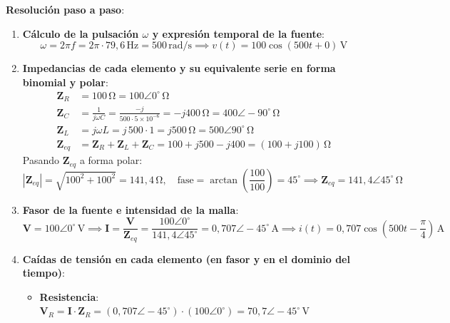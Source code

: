 \begin{ejemplo}
\textbf{Resolución paso a paso}:
\begin{enumerate}
    \item \textbf{Cálculo de la pulsación $\omega$ y expresión temporal de la fuente}:
    \begin{equation*}
        \omega = 2\pi f = 2\pi \cdot 79{,}6\,\si{\hertz} = 500\,\si{\radian/\second} \implies v(t) = 100\cos(500 t + 0)\,\si{\volt}
    \end{equation*}
    \item \textbf{Impedancias de cada elemento y su equivalente serie en forma binomial y polar}:
    \begin{align*}
        \mathbf{Z}_R &= 100\,\si{\ohm} = 100\angle 0^\circ\,\si{\ohm} \\
        \mathbf{Z}_C &= \frac{1}{j\omega C} = \frac{-j}{500 \cdot 5\times 10^{-6}} = -j 400\,\si{\ohm} = 400\angle -90^\circ\,\si{\ohm} \\
        \mathbf{Z}_L &= j\omega L = j\,500\cdot 1 = j 500\,\si{\ohm} = 500\angle 90^\circ\,\si{\ohm} \\
        \mathbf{Z}_{eq} &= \mathbf{Z}_R + \mathbf{Z}_L + \mathbf{Z}_C = 100 + j 500 - j 400 = (100 + j 100)\,\si{\ohm}
    \end{align*}
    Pasando $\mathbf{Z}_{eq}$ a forma polar:
    \begin{equation*}
        |\mathbf{Z}_{eq}| = \sqrt{100^2 + 100^2} = 141{,}4\,\si{\ohm}, \quad \text{fase} = \arctan\left(\frac{100}{100}\right) = 45^\circ \implies \mathbf{Z}_{eq} = 141{,}4\angle 45^\circ\,\si{\ohm}
    \end{equation*}
    \item \textbf{Fasor de la fuente e intensidad de la malla}:
    \begin{equation*}
        \mathbf{V} = 100\angle 0^\circ\,\si{\volt} \implies \mathbf{I} = \frac{\mathbf{V}}{\mathbf{Z}_{eq}} = \frac{100\angle 0^\circ}{141{,}4\angle 45^\circ} = 0{,}707\angle -45^\circ\,\si{\ampere} \implies \boxed{i(t) = 0{,}707\cos\left(500 t - \frac{\pi}{4}\right)\,\si{\ampere}}
    \end{equation*}
    \item \textbf{Caídas de tensión en cada elemento (en fasor y en el dominio del tiempo)}:
    \begin{itemize}
        \item \textbf{Resistencia}: $\mathbf{V}_R = \mathbf{I}\cdot\mathbf{Z}_R = (0{,}707\angle -45^\circ)\cdot(100\angle 0^\circ) = 70{,}7\angle -45^\circ\,\si{\volt}$
        \begin{equation*}

\end{equation*}
\end{itemize}
\end{enumerate}
\end{ejemplo}
